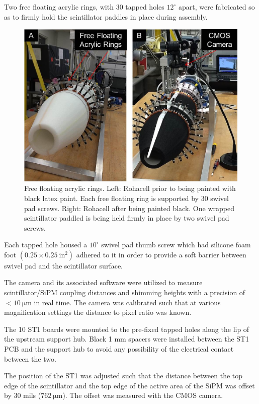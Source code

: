 Two free floating acrylic rings, with 30 tapped holes $12^{\circ}$ apart, were fabricated so as to firmly hold the scintillator paddles in place during assembly. 
	\begin{figure}[!htb]
		\centering
		\includegraphics[width=1.0\columnwidth]{fabrication/figs/st_assembly}
		\caption{Free floating acrylic rings.  Left: Rohacell prior to being painted with black latex paint. Each free floating ring is supported by 30 swivel pad screws. Right: Rohacell after being painted black.  One wrapped scintillator paddled is being held firmly in place by two swivel pad screws.}
		\label{fig:free_floating_rings}
	\end{figure}
Each tapped hole housed a $10^{\circ}$ swivel pad thumb screw which had silicone foam foot $(0.25 \times 0.25\ \mathrm{in^{2}})$ adhered to it in order to provide a soft barrier between swivel pad and the scintillator surface. 

The camera and its associated software were utilized to measure scintillator/SiPM coupling distances and shimming heights with a precision of $\mathrm{< 10\ \mu m}$ in real time.  The camera was calibrated such that at various magnification settings the distance to pixel ratio was known.

The 10 ST1 boards were mounted to the pre-fixed tapped holes along the lip of the upstream support hub.  Black 1 mm spacers were installed between the ST1 PCB and the support hub to avoid any possibility of the electrical contact between the two.  

The position of the ST1 was adjusted such that the distance between the top edge of the scintillator and the top edge of the active area of the SiPM was offset by 30 mils ($\mathrm{762\ \mu m}$).  The offset was measured with the CMOS camera. 

